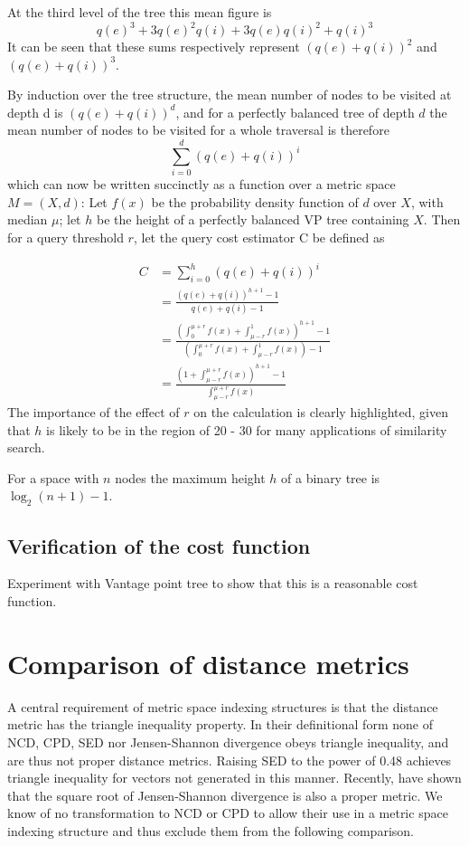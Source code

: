 At the third level of the tree this mean figure is 
\begin{equation}
q(e)^3 + 3q(e)^2q(i) +3q(e)q(i)^2 + q(i)^3
\end{equation}
It can be seen that these sums respectively represent $(q(e) + q(i))^2$  and $(q(e) + q(i))^3$.

By induction over the tree structure, the mean number of nodes to be visited at depth d is $(q(e) + q(i))^d$, and for a perfectly balanced tree of depth $d$ the mean number of nodes to be visited for a whole traversal is therefore
\begin{equation}
	\sum_{i=0}^d (q(e) + q(i))^i
\end{equation}
which can now be written succinctly as a function over a metric space $M = (X, d)$:
Let $f(x)$ be the probability density function of $d$ over $X$, with median $\mu$;  let $h$ be the height of a perfectly balanced VP tree containing $X$. Then for a query threshold $r$, let the query cost estimator C be defined as

\begin{align}
	C & = \sum_{i = 0}^h (q(e) + q(i))^i\\
	  & = \frac{(q(e) + q(i))^{h+1} - 1}{q(e) + q(i) - 1}\\
	  & = \frac{\left( \int_0^{\mu+r} f(x) + \int_{\mu - r}^1 f(x) \right)^{h+1} - 1}{\left( \int_0^{\mu+r} f(x) + \int_{\mu - r}^1 f(x) \right) - 1}\\	  
	  & = \frac{\left(1 + \int_{\mu - r}^{\mu+r} f(x)  \right)^{h+1} - 1}{\int_{\mu - r}^{\mu+r} f(x)}
\end{align}
The importance of the effect of $r$ on the calculation is clearly highlighted, given that $h$ is likely to be in the region of 20 - 30 for many applications of similarity search.

For a space with $n$ nodes the maximum height $h$ of a binary tree is $\log_2(n + 1) - 1$. 
\subsection{Verification of the cost function}
Experiment with Vantage point tree to show that this is a reasonable cost function.
\section{Comparison of distance metrics}
A central requirement of metric space indexing structures is that the distance metric has the triangle inequality property. In their definitional form none of NCD, CPD, SED nor Jensen-Shannon divergence obeys triangle inequality, and are thus not proper distance metrics. 
Raising SED to the power of 0.48 achieves triangle inequality for vectors not generated in this manner.  Recently, \cite{} have shown that the square root of Jensen-Shannon divergence is also a proper metric.  We know of no transformation to NCD or CPD to allow their use in a metric space indexing structure and thus exclude them from the following comparison.

